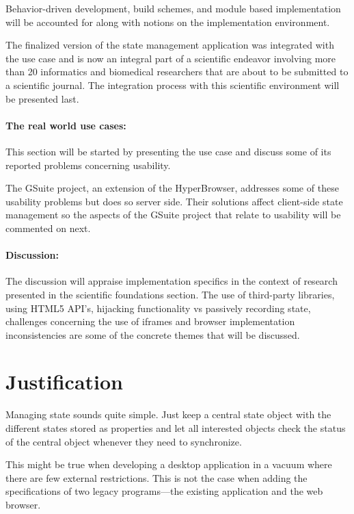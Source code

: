 \documentclass[english]{ifimaster}
\begin{document}
Behavior-driven development, build schemes, and module based implementation will be accounted for along with notions on the implementation environment. 

The finalized version of the state management application was integrated with the use case and is now an integral part of a scientific endeavor involving more than 20 informatics and biomedical researchers that are about to be submitted to a scientific journal. The integration process with this scientific environment will be presented last. 

\paragraph{The real world use cases:}
This section will be started by presenting the use case and discuss some of its reported problems concerning usability. 

The GSuite project, an extension of the HyperBrowser, addresses some of these usability problems but does so server side. Their solutions affect client-side state management so the aspects of the GSuite project that relate to usability will be commented on next.

\paragraph{Discussion:}
The discussion will appraise implementation specifics in the context of research presented in the scientific foundations section. The use of third-party libraries, using HTML5 API's, hijacking functionality vs passively recording state, challenges concerning the use of iframes and browser implementation inconsistencies are some of the concrete themes that will be discussed.

\section{Justification}
Managing state sounds quite simple. Just keep a central state object with the different states stored as properties and let all interested objects check the status of the central object whenever they need to synchronize.

This might be true when developing a desktop application in a vacuum where there are few external restrictions. This is not the case when adding the specifications of two legacy programs---the existing application and the web browser.
\end{document}

